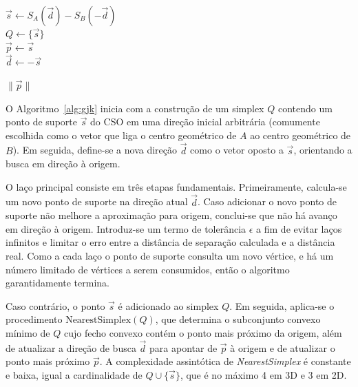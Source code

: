 \begin{algorithm}[htb]
	\caption{GJK}

	$\vec s \leftarrow S_A(\vec d) - S_B(-\vec d)$ \\
	$Q \leftarrow \{\vec s\}$ \\
	$\vec p \leftarrow \vec s$ \\
	$\vec d \leftarrow -\vec s$ \\
	

	\Return $\|\vec p\|$ 
	\label{alg:gjk}
\end{algorithm}

O Algoritmo~\ref{alg:gjk} inicia com a construção de um simplex $Q$ contendo um ponto de suporte $\vec s$ do CSO em uma direção inicial arbitrária (comumente escolhida como o vetor que liga o centro geométrico de $A$ ao centro geométrico de $B$). Em seguida, define-se a nova direção $\vec d$ como o vetor oposto a $\vec s$, orientando a busca em direção à origem.

O laço principal consiste em três etapas fundamentais. Primeiramente, calcula-se um novo ponto de suporte na direção atual $\vec d$. Caso adicionar o novo ponto de suporte não melhore a aproximação para origem, conclui-se que não há avanço em direção à origem. Introduz-se um termo de tolerância $\epsilon$ a fim de evitar laços infinitos e limitar o erro entre a distância de separação calculada e a distância real. Como a cada laço o ponto de suporte consulta um novo vértice, e há um número limitado de vértices a serem consumidos, então o algoritmo garantidamente termina.

Caso contrário, o ponto $\vec s$ é adicionado ao simplex $Q$. Em seguida, aplica-se o procedimento $\text{NearestSimplex}(Q)$, que determina o subconjunto convexo mínimo de $Q$ cujo fecho convexo contém o ponto mais próximo da origem, além de atualizar a direção de busca $\vec d$ para apontar de $\vec p$ à origem e de atualizar o ponto mais próximo $\vec p$. A complexidade assintótica de \textit{NearestSimplex} é constante e baixa, igual a cardinalidade de $Q \cup \{ \vec s \}$, que é no máximo 4 em 3D e 3 em 2D.

